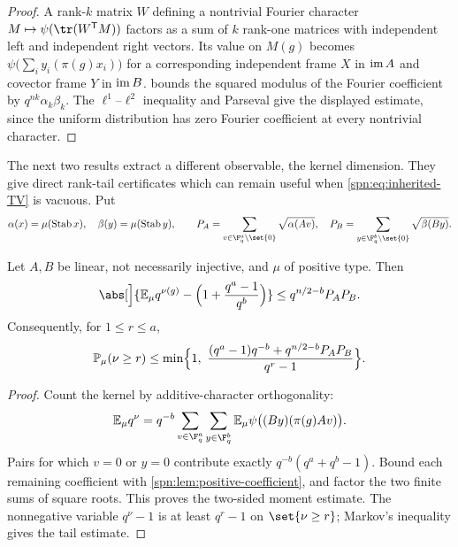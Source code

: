 \begin{proof}
A rank-$k$ matrix $W$ defining a nontrivial Fourier character
$M\mapsto\psi(\tr(W^{\spnT}M))$ factors as a sum of $k$ rank-one matrices
with independent left and independent right vectors. Its value on $M(g)$
becomes $\psi\bigl(\sum_iy_i(\pi(g)x_i)\bigr)$ for a corresponding independent
frame $X$ in $\operatorname{im} A$ and covector frame $Y$ in $\operatorname{im} B$.
 bounds the squared modulus of the Fourier
coefficient by $q^{nk}\alpha_k\beta_k$. The $\ell^1$--$\ell^2$ inequality and
Parseval give the displayed estimate, since the uniform distribution has zero
Fourier coefficient at every nontrivial character.
\end{proof}

The next two results extract a different observable, the kernel dimension.
They give direct rank-tail certificates which can remain useful when
\eqref{spn:eq:inherited-TV} is vacuous. Put
\[
 \alpha(x)=\mu(\spnStab x),\quad\beta(y)=\mu(\spnStab y),\qquad
 P_A=\sum_{v\in\F_q^a\setminus\set{0}}\sqrt{\alpha(Av)},\quad
 P_B=\sum_{y\in\F_q^b\setminus\set{0}}\sqrt{\beta(By)} .
\]

\begin{proposition}\label{spn:prop:kernel-first-moment}
Let $A,B$ be linear, not necessarily injective, and $\mu$ of positive type.
Then
\begin{equation}\label{spn:eq:first-kernel-moment}
 \abs[\Big]{\spnE_\mu q^{\nu(g)}-\Bigl(1+\frac{q^a-1}{q^b}\Bigr)}
 \le q^{n/2-b}P_AP_B .
\end{equation}
Consequently, for $1\le r\le a$,
\begin{equation}\label{spn:eq:first-kernel-tail}
 \mathbb{P}_\mu(\nu\ge r)\le\min\Bigl\{1,\
 \frac{(q^a-1)q^{-b}+q^{n/2-b}P_AP_B}{q^r-1}\Bigr\}.
\end{equation}
\end{proposition}

\begin{proof}
Count the kernel by additive-character orthogonality:
\[
 \spnE_\mu q^\nu=q^{-b}\sum_{v\in\F_q^a}\sum_{y\in\F_q^b}
 \spnE_\mu\psi\bigl((By)(\pi(g)Av)\bigr).
\]
Pairs for which $v=0$ or $y=0$ contribute exactly $q^{-b}(q^a+q^b-1)$. Bound
each remaining coefficient with \cref{spn:lem:positive-coefficient}, and
factor the two finite sums of square roots. This proves the two-sided moment
estimate. The nonnegative variable $q^\nu-1$ is at least $q^r-1$ on
$\set{\nu\ge r}$; Markov's inequality gives the tail estimate.
\end{proof}

